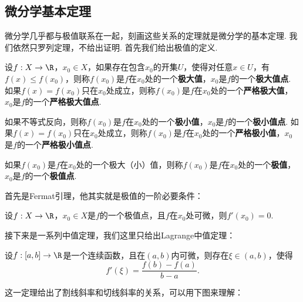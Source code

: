 \subsection{微分学基本定理}

微分学几乎都与极值联系在一起，刻画这些关系的定理就是微分学的基本定理. 我们依然只罗列定理，不给出证明. 首先我们给出极值的定义. 

\begin{definition}\label{def:extremum}
    设$f:X\to\R$，$x_0\in X$，如果存在包含$x_0$的开集$U$，使得对任意$x\in U$，有$f(x)\leq f(x_0)$，则称$f(x_0)$是$f$在$x_0$处的一个\textbf{极大值}，$x_0$是$f$的一个\textbf{极大值点}. 如果$f(x)=f(x_0)$只在$x_0$处成立，则称$f(x_0)$是$f$在$x_0$处的一个\textbf{严格极大值}，$x_0$是$f$的一个\textbf{严格极大值点}.
    
    如果不等式反向，则称$f(x_0)$是$f$在$x_0$处的一个\textbf{极小值}，$x_0$是$f$的一个\textbf{极小值点}. 如果$f(x)=f(x_0)$只在$x_0$处成立，则称$f(x_0)$是$f$在$x_0$处的一个\textbf{严格极小值}，$x_0$是$f$的一个\textbf{严格极小值点}.
    
    如果$f(x_0)$是$f$在$x_0$处的一个极大（小）值，则称$f(x_0)$是$f$在$x_0$处的一个\textbf{极值}，$x_0$是$f$的一个\textbf{极值点}. 
\end{definition}

首先是Fermat引理，他其实就是极值的一阶必要条件：

\begin{lemma}[Fermat引理]\label{lemma:fermat}
    设$f:X\to\R$，$x_0\in X$是$f$的一个极值点，且$f$在$x_0$处可微，则$f'(x_0)=0$.
\end{lemma}

接下来是一系列中值定理，我们这里只给出Lagrange中值定理：

\begin{theorem}[Lagrange中值定理]\label{thm:lagrange-mid}
    设$f:[a,b]\to\R$是一个连续函数，且在$(a,b)$内可微，则存在$\xi\in(a,b)$，使得
    \[
        f'(\xi)=\frac{f(b)-f(a)}{b-a}.
    \]
\end{theorem}

这一定理给出了割线斜率和切线斜率的关系，可以用下图来理解：

\begin{center}
\end{center}

